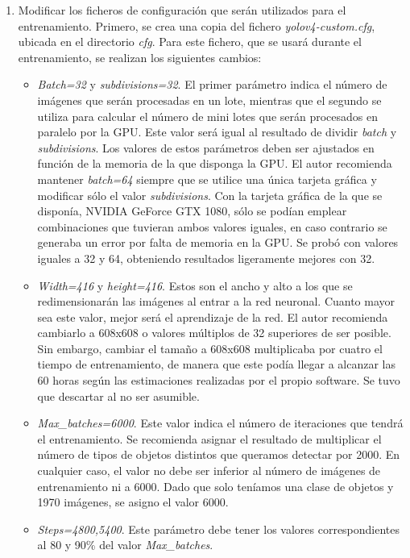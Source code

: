 \begin{enumerate}
    \item Modificar los ficheros de configuración que serán utilizados para el entrenamiento. Primero, se crea una copia del fichero \textit{yolov4-custom.cfg}, ubicada en el directorio \textit{cfg}. Para este fichero, que se usará durante el entrenamiento, se realizan los siguientes cambios:
    
    \begin{itemize}
        \item \textit{Batch=32} y \textit{subdivisions=32}. El primer parámetro indica el número de imágenes que serán procesadas en un lote, mientras que el segundo se utiliza para calcular el número de mini lotes que serán procesados en paralelo por la GPU. Este valor será igual al resultado de dividir \textit{batch} y \textit{subdivisions}. Los valores de estos parámetros deben ser ajustados en función de la memoria de la que disponga la GPU. El autor recomienda mantener \textit{batch=64} siempre que se utilice una única tarjeta gráfica y modificar sólo el valor \textit{subdivisions}. Con la tarjeta gráfica de la que se disponía, NVIDIA GeForce GTX 1080, sólo se podían emplear combinaciones que tuvieran ambos valores iguales, en caso contrario se generaba un error por falta de memoria en la GPU. Se probó con valores iguales a 32 y 64, obteniendo resultados ligeramente mejores con 32.
        \item \textit{Width=416} y \textit{height=416}. Estos son el ancho y alto a los que se redimensionarán las imágenes al entrar a la red neuronal. Cuanto mayor sea este valor, mejor será el aprendizaje de la red. El autor recomienda cambiarlo a 608x608 o valores múltiplos de 32 superiores de ser posible. Sin embargo, cambiar el tamaño a 608x608 multiplicaba por cuatro el tiempo de entrenamiento, de manera que este podía llegar a alcanzar las 60 horas según las estimaciones realizadas por el propio software. Se tuvo que descartar al no ser asumible.
        \item \textit{Max\_batches=6000}. Este valor indica el número de iteraciones que tendrá el entrenamiento. Se recomienda asignar el resultado de multiplicar el número de tipos de objetos distintos que queramos detectar por 2000. En cualquier caso, el valor no debe ser inferior al número de imágenes de entrenamiento ni a 6000. Dado que solo teníamos una clase de objetos y 1970 imágenes, se asigno el valor 6000.
        \item \textit{Steps=4800,5400}. Este parámetro debe tener los valores correspondientes al 80 y 90\% del valor \textit{Max\_batches}.

\end{itemize}
\end{enumerate}
